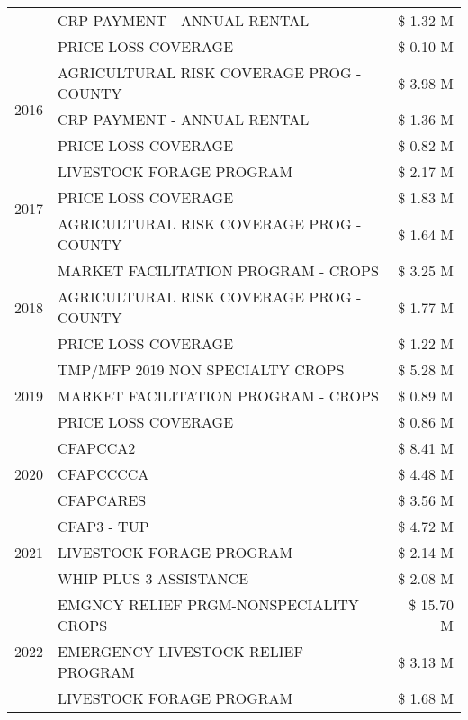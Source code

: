 \begin{tabular}{llr}
 & CRP PAYMENT - ANNUAL RENTAL & \$ 1.32 M \\
 & PRICE LOSS COVERAGE & \$ 0.10 M \\
\cline{1-3}
\multirow[t]{3}{*}{2016} & AGRICULTURAL RISK COVERAGE PROG - COUNTY & \$ 3.98 M \\
 & CRP PAYMENT - ANNUAL RENTAL & \$ 1.36 M \\
 & PRICE LOSS COVERAGE & \$ 0.82 M \\
\cline{1-3}
\multirow[t]{3}{*}{2017} & LIVESTOCK FORAGE PROGRAM & \$ 2.17 M \\
 & PRICE LOSS COVERAGE & \$ 1.83 M \\
 & AGRICULTURAL RISK COVERAGE PROG - COUNTY & \$ 1.64 M \\
\cline{1-3}
\multirow[t]{3}{*}{2018} & MARKET FACILITATION PROGRAM - CROPS & \$ 3.25 M \\
 & AGRICULTURAL RISK COVERAGE PROG - COUNTY & \$ 1.77 M \\
 & PRICE LOSS COVERAGE & \$ 1.22 M \\
\cline{1-3}
\multirow[t]{3}{*}{2019} & TMP/MFP 2019 NON SPECIALTY CROPS & \$ 5.28 M \\
 & MARKET FACILITATION PROGRAM - CROPS & \$ 0.89 M \\
 & PRICE LOSS COVERAGE & \$ 0.86 M \\
\cline{1-3}
\multirow[t]{3}{*}{2020} & CFAPCCA2 & \$ 8.41 M \\
 & CFAPCCCCA & \$ 4.48 M \\
 & CFAPCARES & \$ 3.56 M \\
\cline{1-3}
\multirow[t]{3}{*}{2021} & CFAP3 - TUP & \$ 4.72 M \\
 & LIVESTOCK FORAGE PROGRAM & \$ 2.14 M \\
 & WHIP PLUS 3 ASSISTANCE & \$ 2.08 M \\
\cline{1-3}
\multirow[t]{3}{*}{2022} & EMGNCY RELIEF PRGM-NONSPECIALITY CROPS & \$ 15.70 M \\
 & EMERGENCY LIVESTOCK RELIEF PROGRAM & \$ 3.13 M \\
 & LIVESTOCK FORAGE PROGRAM & \$ 1.68 M \\
\cline{1-3}
\bottomrule
\end{tabular}
